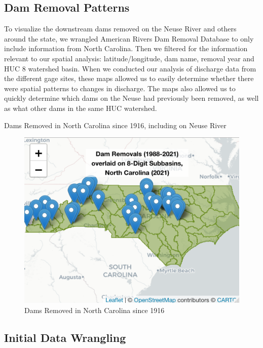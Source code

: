 \documentclass[
  12pt,
]{article}
\begin{document}
\hypertarget{dam-removal-patterns}{%
\subsection{Dam Removal Patterns}\label{dam-removal-patterns}}

To visualize the downstream dams removed on the Neuse River and others
around the state, we wrangled American Rivers Dam Removal Database to
only include information from North Carolina. Then we filtered for the
information relevant to our spatial analysis: latitude/longitude, dam
name, removal year and HUC 8 watershed basin. When we conducted our
analysis of discharge data from the different gage sites, these maps
allowed us to easily determine whether there were spatial patterns to
changes in discharge. The maps also allowed us to quickly determine
which dams on the Neuse had previously been removed, as well as what
other dams in the same HUC watershed.

Dams Removed in North Carolina since 1916, including on Neuse River

\begin{figure}
\centering
\includegraphics{"./Output/dam.removal.map.png"}
\caption{Dams Removed in North Carolina since 1916}
\end{figure}

\hypertarget{initial-data-wrangling}{%
\subsection{Initial Data Wrangling}\label{initial-data-wrangling}}
\end{document}
